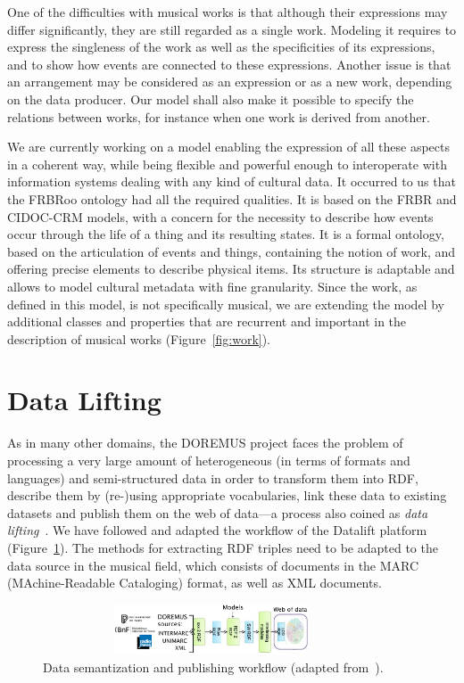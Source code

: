 \documentclass{llncs}
\begin{document}
\vspace{-0.5cm}
One of the difficulties with musical works is that although their expressions may differ significantly, they are still regarded as a single work. Modeling it requires to express the singleness of the work as well as the specificities of its expressions, and to show how events are connected to these expressions. Another issue is that an arrangement may be considered as an expression or as a new work, depending on the data producer. Our model shall also make it possible to specify the relations between works, for instance when one work is derived from another.

We are currently working on a model enabling the expression of all these aspects in a coherent way, while being flexible and powerful enough to interoperate with information systems dealing with any kind of cultural data. It occurred to us that the FRBRoo ontology had all the required qualities. It is based on the FRBR and CIDOC-CRM  models, with a concern for the necessity to describe how events occur through the life of a thing and its resulting states. It is a formal ontology, based on the articulation of events and things, containing the notion of work, and offering precise elements to describe physical items. Its structure is adaptable and allows to model cultural metadata with fine granularity. Since the work, as defined in this model, is not specifically musical, we are extending the model by additional classes and properties that are recurrent and important in the description of musical works (Figure~\ref{fig:work}).


\section{Data Lifting}
\label{sec:data-lifting}
As in many other domains, the DOREMUS project faces the problem of processing a very large amount of heterogeneous (in terms of formats and languages) and semi-structured data in order to transform them into RDF, describe them by (re-)using appropriate vocabularies, link these data to existing datasets and publish them on the web of data---a process also coined as \emph{data lifting}~\cite{scharffe2012enabling}. We have followed and adapted the workflow of the Datalift platform (Figure~\ref{fig:datalift}). The methods for extracting RDF triples need to be adapted to the data source in the musical field, which consists of documents in the MARC (MAchine-Readable Cataloging) format, as well as XML documents. %
\begin{figure}
  \centering
  \includegraphics[width=10cm, height=1.5cm]{img/datalift-doremus.png}
  \caption{Data semantization and publishing workflow (adapted from~\cite{scharffe2012enabling}).}
  \label{fig:datalift}
\end{figure}
\end{document}
